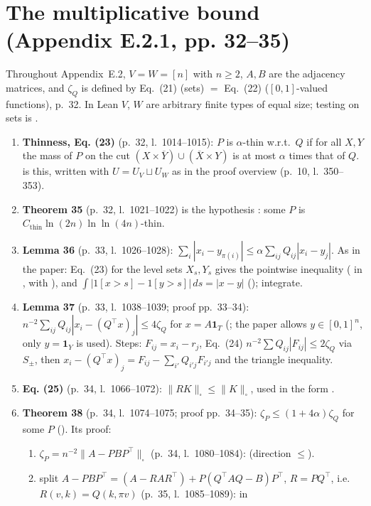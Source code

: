 \section{The multiplicative bound (Appendix E.2.1, pp. 32--35)}
Throughout Appendix~E.2, $V=W=[n]$ with $n\ge2$, $A,B$ are the adjacency matrices, and $\zeta_Q$ is defined by Eq.~(21)
(sets) $=$ Eq.~(22) ($[0,1]$-valued functions), p.~32. In Lean $V$, $W$ are arbitrary finite types of equal size;
testing on sets is .
\begin{enumerate}
\item \textbf{Thinness, Eq. (23)} (p.~32, l.~1014--1015): $P$ is $\alpha$-thin w.r.t.\ $Q$ if for all $X,Y$ the mass of $P$ on the cut
$(X\times\overline Y)\cup(\overline X\times Y)$ is at most $\alpha$ times that of $Q$.  is this, written with
$U=U_V\sqcup U_W$ as in the proof overview (p.~10, l.~350--353).
\item \textbf{Theorem 35} (p.~32, l.~1021--1022) is the hypothesis : some $P$ is
$C_{\mathrm{thin}}\ln(2n)\ln\ln(4n)$-thin.
\item \textbf{Lemma 36} (p.~33, l.~1026--1028): $\sum_i|x_i-y_{\pi(i)}|\le\alpha\sum_{ij}Q_{ij}|x_i-y_j|$. As in the paper: Eq.~(23) for the
level sets $X_s,Y_s$ gives the pointwise inequality ( in , with ), and
$\int|1[x>s]-1[y>s]|\,ds=|x-y|$ (); integrate.
\item \textbf{Lemma 37} (p.~33, l.~1038--1039; proof pp.~33--34): $n^{-2}\sum_{ij}Q_{ij}|x_i-(Q^\top x)_j|\le4\zeta_Q$ for $x=A\mathbf 1_T$
(; the paper allows $y\in[0,1]^n$, only $y=\mathbf1_Y$ is used). Steps: $F_{ij}=x_i-r_j$, Eq.~(24)
$n^{-2}\sum Q_{ij}|F_{ij}|\le2\zeta_Q$ via $S_\pm$, then $x_i-(Q^\top x)_j=F_{ij}-\sum_{i'}Q_{i'j}F_{i'j}$ and the triangle
inequality.
\item \textbf{Eq. (25)} (p.~34, l.~1066--1072): $\|RK\|_\square\le\|K\|_\square$, used in the form .
\item \textbf{Theorem 38} (p.~34, l.~1074--1075; proof pp.~34--35): $\zeta_P\le(1+4\alpha)\zeta_Q$ for some $P$ (). Its proof:
  \begin{enumerate}
  \item $\zeta_P=n^{-2}\|A-PBP^\top\|_\square$ (p.~34, l.~1080--1084):  (direction $\le$).
  \item split $A-PBP^\top=(A-RAR^\top)+P(Q^\top AQ-B)P^\top$, $R=PQ^\top$, i.e.\ $R(v,k)=Q(k,\pi v)$ (p.~35, l.~1085--1089):  in

\end{enumerate}
\end{enumerate}
